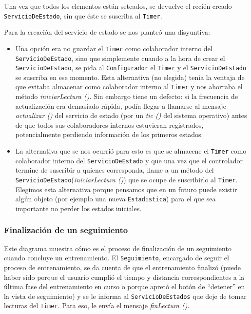  Una vez que todos los elementos están seteados, se devuelve el recién creado \texttt{ServicioDeEstado}, sin que éste se suscriba al \texttt{Timer}.  


Para la creación del servicio de estado se nos planteó una disyuntiva:
\begin{itemize}
	\item Una opción era no guardar el \texttt{Timer} como colaborador interno del \texttt{ServicioDeEstado}, sino que simplemente cuando a la hora de crear el \texttt{ServicioDeEstado}, se pida al \texttt{Configurador} el \texttt{Timer} y el \texttt{ServicioDeEstado} se suscriba en ese momento. Esta alternativa (no elegida) tenía la ventaja de que evitaba almacenar como colaborador interno al \texttt{Timer} y nos ahorraba el método \emph{iniciarLectura ()}. Sin embargo tiene un defecto: si la frecuencia de actualización era demasiado rápida, podía llegar a llamarse al mensaje \emph{actualizar ()} del servicio de estado (por un \emph{tic ()} del sistema operativo) antes de que todos sus colaboradores internos estuvieran registrados, potencialmente perdiendo información de los primeros estados.
	\item La alternativa que se nos ocurrió para esto es que se almacene el \texttt{Timer} como colaborador interno del \texttt{ServicioDeEstado} y que una vez que el controlador termine de suscribir a quienes corresponda, llame a un método del \texttt{ServicioDeEstado}(\emph{iniciarLectura ()}) que se ocupe de suscribirlo al \texttt{Timer}. Elegimos esta alternativa porque pensamos que en un futuro puede existir algún objeto (por ejemplo una nueva \texttt{Estadistica}) para el que sea importante no perder los estados iniciales. 
\end{itemize}


\subsubsection{Finalización de un seguimiento}

Este diagrama muestra cómo es el proceso de finalización de un seguimiento cuando concluye un entrenamiento. El \texttt{Seguimiento}, encargado de seguir el proceso de entrenamiento, se da cuenta de que el entrenamiento finalizó (puede haber sido porque el usuario cumplió el tiempo y distancia correspondientes a la última fase del entrenamiento en curso o porque apretó el botón de ``detener'' en la vista de seguimiento) y se le informa al \texttt{ServicioDeEstados} que deje de tomar lecturas del \texttt{Timer}. Para eso, le envía el mensaje \emph{finLectura ()}. 

